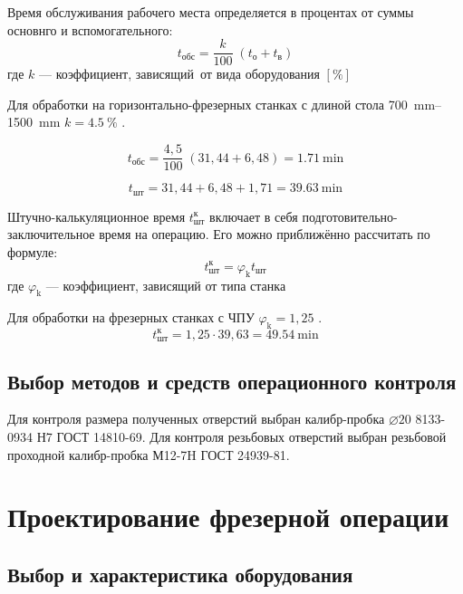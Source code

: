 \documentclass[14pt,russian,a4paper]{extreport}
\begin{document}
Время обслуживания рабочего места определяется в процентах от суммы основнго и вспомогательного: 
\begin{equation}
  t_\text{обс} = \frac{k}{100} \; (t_\text{о} + t_\text{в})
\end{equation}
где $k$ --- коэффициент, зависящий от вида оборудования $[\%]$

Для обработки на горизонтально-фрезерных станках с длиной стола \SIrange{700}{1500}{\milli\meter} $ k = \SI{4,5}{\percent} $ \cite[прил.~5]{malzen:normirovanie}.

\begin{equation*}
  t_\text{обс} = \frac{4,5}{100} \; (31,44 + 6,48) = \SI{1,71}{\minute}
\end{equation*}

\begin{equation*}
  t_\text{шт} = 31,44 + 6,48 + 1,71 = \SI{39,63}{\minute}
\end{equation*}

Штучно-калькуляционное время $t_\text{шт}^\text{к}$ включает в себя подготовительно-заключительное время на операцию. Его можно приближённо рассчитать по формуле: 
\begin{equation}
  t_\text{шт}^\text{к} = \varphi_\text{k} t_\text{шт}
\end{equation}
где $\varphi_\text{k}$ --- коэффициент, зависящий от типа станка

Для обработки на фрезерных станках с ЧПУ $ \varphi_\text{k} = 1,25 $ \cite[прил.~7]{malzen:normirovanie}.
\begin{equation*}
  t_\text{шт}^\text{к} = 1,25 \cdot 39,63 = \SI{49,54}{\minute}
\end{equation*}


\subsection{Выбор методов и средств операционного контроля}

Для контроля размера полученных отверстий выбран калибр-пробка $\diameter 20$ 8133-0934 Н7 ГОСТ 14810-69. Для контроля резьбовых отверстий выбран резьбовой проходной калибр-пробка М12-7H ГОСТ 24939-81.

\section{Проектирование фрезерной операции}

\subsection{Выбор и характеристика оборудования}
\end{document}

